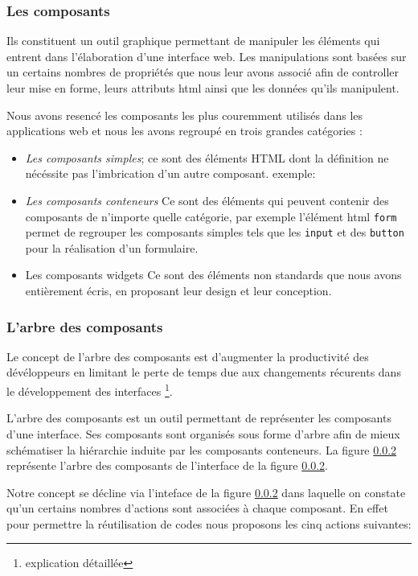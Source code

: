 \documentclass[a4paper,12pt]{article}
\begin{document}
\subsubsection{ Les composants} %
Ils constituent un outil graphique permettant de manipuler les
éléments qui entrent dans l'élaboration d'une interface web. Les
manipulations sont basées sur un certains nombres de propriétés que 
nous leur avons associé afin de controller leur mise en forme, leurs
attributs html ainsi que les données qu'ils manipulent.

Nous avons resencé les composants les plus couremment utilisés dans les
applications web et nous les avons regroupé en trois grandes
catégories :

\begin{itemize}
\item {\em Les composants simples};
ce sont des éléments HTML dont la définition ne nécéssite pas
l'imbrication d'un autre composant.
exemple:
\item  {\em Les composants conteneurs} 
Ce sont des éléments qui peuvent contenir des composants de
n'importe quelle catégorie, par exemple l'élément html {\tt form}
permet de regrouper les composants simples tels que les {\tt input} et
des {\tt button} pour la réalisation d'un formulaire.
\item Les composants widgets
Ce sont des éléments non standards que nous avons entièrement écris, en
proposant leur design et leur conception.
\end{itemize}



\subsubsection{ L'arbre des composants} 
Le concept de l'arbre des composants est d'augmenter la productivité
des dévéloppeurs en limitant le perte de temps due aux changements
récurents dans le développement des interfaces \footnote{explication détaillée}.


L'arbre des composants est un outil permettant de représenter les
composants d'une interface. Ses composants sont organisés sous forme
d'arbre afin de mieux schématiser la hiérarchie induite par les
composants conteneurs. La figure \ref{} représente l'arbre des
composants de l'interface de la figure \ref{}.

Notre concept se décline via l'inteface de la figure \ref{} dans
laquelle on constate qu'un certains nombres d'actions sont associées à
chaque composant. En effet pour permettre la réutilisation de codes
nous proposons les cinq actions suivantes:
\end{document}

